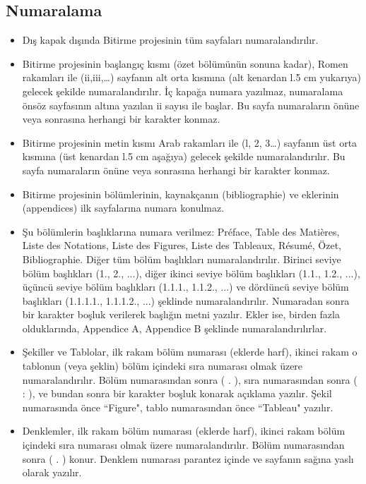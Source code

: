 \subsection{Numaralama}
\begin{itemize}
\item Dış kapak dışında Bitirme projesinin tüm sayfaları numaralandırılır.
\item Bitirme projesinin başlangıç kısmı (özet bölümünün sonuna kadar), Romen rakamları ile (ii,iii,…) sayfanın alt orta kısmına (alt kenardan l.5 cm yukarıya) gelecek şekilde numaralandırılır. İç kapağa numara yazılmaz, numaralama önsöz sayfasının altına yazılan ii sayısı ile başlar. Bu sayfa numaraların önüne veya sonrasına herhangi bir karakter konmaz.
\item Bitirme projesinin metin kısmı Arab rakamları ile (l, 2, 3…) sayfanın üst orta kısmına (üst kenardan l.5 cm aşağıya) gelecek şekilde numaralandırılır. Bu sayfa numaraların önüne veya sonrasına herhangi bir karakter konmaz.
\item Bitirme projesinin bölümlerinin, kaynakçanın (bibliographie) ve eklerinin (appendices) ilk sayfalarına numara konulmaz. 
\item Şu bölümlerin başlıklarına numara verilmez: Préface, Table des Matières, Liste des Notations, Liste des Figures, Liste des Tableaux, Résumé, Özet, Bibliographie. Diğer tüm bölüm başlıkları numaralandırılır. Birinci seviye bölüm başlıkları (1., 2., ...), diğer ikinci seviye bölüm başlıkları (1.1., 1.2., ...), üçüncü seviye bölüm başlıkları (1.1.1., 1.1.2., ...) ve dördüncü seviye bölüm başlıkları (1.1.1.1., 1.1.1.2., ...) şeklinde numaralandırılır. Numaradan sonra bir karakter boşluk verilerek başlığın metni yazılır. Ekler ise, birden fazla olduklarında, Appendice A, Appendice B şeklinde numaralandırılırlar.
\item Şekiller ve Tablolar, ilk rakam bölüm numarası (eklerde harf), ikinci rakam o tablonun (veya şeklin) bölüm içindeki sıra numarası olmak üzere numaralandırılır. Bölüm numarasından sonra ( . ), sıra numarasından sonra ( : ), ve bundan sonra bir karakter boşluk konarak açıklama yazılır. Şekil numarasında önce ``Figure", tablo numarasından önce ``Tableau" yazılır.
\item Denklemler, ilk rakam bölüm numarası (eklerde harf), ikinci rakam bölüm içindeki sıra numarası olmak üzere numaralandırılır. Bölüm numarasından sonra ( . ) konur. Denklem numarası parantez içinde ve sayfanın sağına yaslı olarak yazılır.
\end{itemize}

